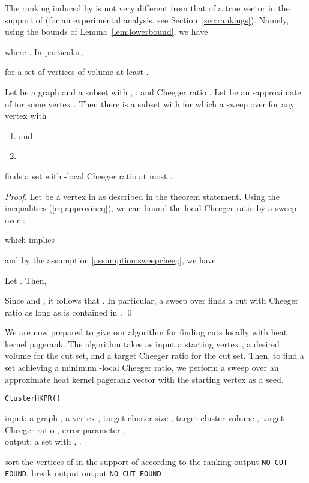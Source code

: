 \documentclass[runningheads,a4paper]{llncs}
\newcommand{\partitionalgparams}{\texttt{ClusterHKPR()}}
\begin{document}
The ranking induced by  is not very different from that of a true
vector  in the support of  (for an experimental analysis,
see Section~\ref{sec:rankings}).  Namely, using the bounds of
Lemma~\ref{lem:lowerbound}, we have
 
where .  In particular,

for a set of vertices  of volume at least .

\begin{theorem}\label{thm:main}
Let  be a graph and  a subset with , , and Cheeger ratio .  Let
 be an -approximate of  for some vertex .
Then there is a subset  with  for
which a sweep over  for any vertex  with
\begin{enumerate}
\item and
\item\label{assumption:sweepcheeg}
\end{enumerate}
finds a set with -local Cheeger ratio at most .
\end{theorem}

\begin{proof}
Let  be a vertex in  as described in the theorem statement.  Using the
inequalities (\ref{eq:approxineq}), we can bound the local Cheeger ratio by a
sweep over :

which implies

and by the assumption \ref{assumption:sweepcheeg}, we have


Let .
Then, 

Since  and , it follows that
.  In particular, a sweep over
 finds a cut with Cheeger ratio  as long as  is
contained in .
\qed\end{proof}

We are now prepared to give our algorithm for finding cuts locally with heat
kernel pagerank.  The algorithm takes as input a starting vertex , a desired
volume  for the cut set, and a target Cheeger ratio  for the
cut set.  Then, to find a set achieving a minimum -local Cheeger
ratio, we perform a sweep over an approximate heat kernel pagerank vector with
the starting vertex as a seed.

\begin{algorithm}[H]
\caption*{\partitionalgparams}
\label{alg:localpart}
input: a graph , a vertex , target cluster size , target cluster volume
, target Cheeger ratio , error parameter
.\\
output: a set  with ,
.\\
\begin{algorithmic}[1]
  \State 
  \State \label{line:hkpr}
  \State sort the vertices of  in the support of  according to the ranking
\label{line:sort}
  \For{}\label{line:sweep}
    \State 
    \If{}\label{line:volume}
      \State output \texttt{NO CUT FOUND}, break
    \label{line:checks}
      \State output 
    \Else
      \State output \texttt{NO CUT FOUND}
    \EndIf
  \EndFor
\end{algorithmic}
\end{algorithm}
\end{document}
